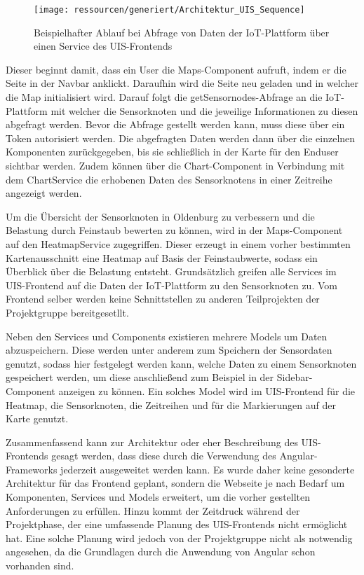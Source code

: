 \begin{figure}[!htb]
	\centering
	\texttt{[image: ressourcen/generiert/Architektur\_UIS\_Sequence]}
	\caption{Beispielhafter Ablauf bei Abfrage von Daten der IoT-Plattform über einen Service des UIS-Frontends}
	\label{fig:UISArchitekturSequence}
\end{figure}

Dieser beginnt damit, dass ein User die Maps-Component aufruft, indem er die Seite in der Navbar anklickt.
Daraufhin wird die Seite neu geladen und in welcher die Map initialisiert wird. 
Darauf folgt die getSensornodes-Abfrage an die IoT-Plattform mit welcher die Sensorknoten und die jeweilige Informationen zu diesen abgefragt werden. 
Bevor die Abfrage gestellt werden kann, muss diese über ein Token autorisiert werden.
Die abgefragten Daten werden dann über die einzelnen Komponenten zurückgegeben, bis sie schließlich in der Karte für den Enduser sichtbar werden.
Zudem können über die Chart-Component in Verbindung mit dem ChartService die erhobenen Daten des Sensorknotens in einer Zeitreihe angezeigt werden. 

Um die Übersicht der Sensorknoten in Oldenburg zu verbessern und die Belastung durch Feinstaub bewerten zu können, wird in der Maps-Component auf den HeatmapService zugegriffen. 
Dieser erzeugt in einem vorher bestimmten Kartenausschnitt eine Heatmap auf Basis der Feinstaubwerte, sodass ein Überblick über die Belastung entsteht.
Grundsätzlich greifen alle Services im UIS-Frontend auf die Daten der IoT-Plattform zu den Sensorknoten zu. 
Vom Frontend selber werden keine Schnittstellen zu anderen Teilprojekten der Projektgruppe bereitgesetllt.


Neben den Services und Components existieren mehrere Models um Daten abzuspeichern. 
Diese werden unter anderem zum Speichern der Sensordaten genutzt, sodass hier festgelegt werden kann, welche Daten zu einem Sensorknoten gespeichert werden, um diese anschließend zum Beispiel in der Sidebar-Component anzeigen zu können. 
Ein solches Model wird im UIS-Frontend für die Heatmap, die Sensorknoten, die Zeitreihen und für die Markierungen auf der Karte genutzt.


Zusammenfassend kann zur Architektur oder eher Beschreibung des UIS-Frontends gesagt werden, dass diese durch die Verwendung des Angular-Frameworks jederzeit ausgeweitet werden kann. Es wurde daher keine gesonderte Architektur für das Frontend geplant, sondern die Webseite je nach Bedarf um Komponenten, Services und Models erweitert, um die vorher gestellten Anforderungen zu erfüllen. Hinzu kommt der Zeitdruck während der Projektphase, der eine umfassende Planung des UIS-Frontends nicht ermöglicht hat. Eine solche Planung wird jedoch von der Projektgruppe nicht als notwendig angesehen, da die Grundlagen durch die Anwendung von Angular schon vorhanden sind. 

